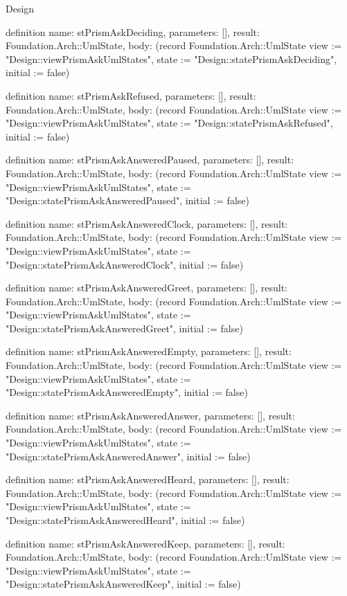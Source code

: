 \begin{lexlean}{Design}
\begin{semanticmodule}
definition{
  name: stPrismAskDeciding,
  parameters: [],
  result: Foundation.Arch::UmlState,
  body: (record Foundation.Arch::UmlState {view := "Design::viewPrismAskUmlStates", state := "Design::statePrismAskDeciding", initial := false})
}

definition{
  name: stPrismAskRefused,
  parameters: [],
  result: Foundation.Arch::UmlState,
  body: (record Foundation.Arch::UmlState {view := "Design::viewPrismAskUmlStates", state := "Design::statePrismAskRefused", initial := false})
}

definition{
  name: stPrismAskAnsweredPaused,
  parameters: [],
  result: Foundation.Arch::UmlState,
  body: (record Foundation.Arch::UmlState {view := "Design::viewPrismAskUmlStates", state := "Design::statePrismAskAnsweredPaused", initial := false})
}

definition{
  name: stPrismAskAnsweredClock,
  parameters: [],
  result: Foundation.Arch::UmlState,
  body: (record Foundation.Arch::UmlState {view := "Design::viewPrismAskUmlStates", state := "Design::statePrismAskAnsweredClock", initial := false})
}

definition{
  name: stPrismAskAnsweredGreet,
  parameters: [],
  result: Foundation.Arch::UmlState,
  body: (record Foundation.Arch::UmlState {view := "Design::viewPrismAskUmlStates", state := "Design::statePrismAskAnsweredGreet", initial := false})
}

definition{
  name: stPrismAskAnsweredEmpty,
  parameters: [],
  result: Foundation.Arch::UmlState,
  body: (record Foundation.Arch::UmlState {view := "Design::viewPrismAskUmlStates", state := "Design::statePrismAskAnsweredEmpty", initial := false})
}

definition{
  name: stPrismAskAnsweredAnswer,
  parameters: [],
  result: Foundation.Arch::UmlState,
  body: (record Foundation.Arch::UmlState {view := "Design::viewPrismAskUmlStates", state := "Design::statePrismAskAnsweredAnswer", initial := false})
}

definition{
  name: stPrismAskAnsweredHeard,
  parameters: [],
  result: Foundation.Arch::UmlState,
  body: (record Foundation.Arch::UmlState {view := "Design::viewPrismAskUmlStates", state := "Design::statePrismAskAnsweredHeard", initial := false})
}

definition{
  name: stPrismAskAnsweredKeep,
  parameters: [],
  result: Foundation.Arch::UmlState,
  body: (record Foundation.Arch::UmlState {view := "Design::viewPrismAskUmlStates", state := "Design::statePrismAskAnsweredKeep", initial := false})
}


\end{semanticmodule}
\end{lexlean}
